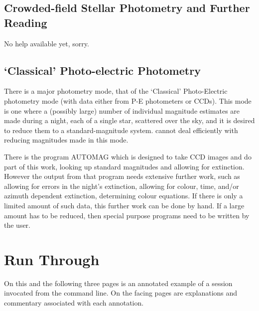 \subsection{Crowded-field Stellar Photometry and Further Reading}
 
 
No help available yet, sorry.
 
\subsection{`Classical' Photo-electric Photometry}
 
There is a major photometry mode, that of the `Classical' Photo-Electric
photometry mode (with data either from P-E photometers or CCDs). This mode
is one where a (possibly large) number of individual magnitude estimates
are made during a night, each of a single star, scattered over the sky, and
it is desired to reduce them to a standard-magnitude system. \starman cannot
deal efficiently with  reducing magnitudes made in this mode.
 
There is the \starman program AUTOMAG which is designed to take CCD
images and do part of this work, looking up standard magnitudes and allowing
for extinction. However the output from that program needs extensive
further work, such as allowing for errors in the night's extinction,
allowing for colour, time, and/or azimuth dependent extinction, determining
colour equations. If there is only a limited amount of such data, this
further work can be done by hand. If a large amount has to be reduced, then
special purpose programs need to be written by the user.
 
 
 
 
\newpage 
 
\section{Run Through}
\label{se:run_through}

On this and the following three pages is an annotated example of a \starman
session invocated from the command line. On the facing pages are
explanations and commentary associated with each annotation.

